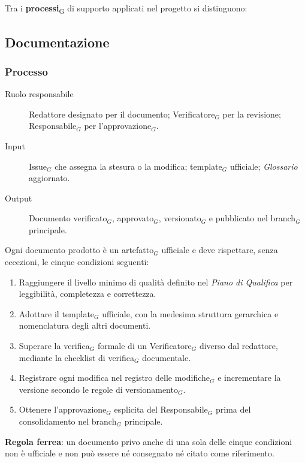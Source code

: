 \documentclass[a4paper, 10pt]{article}
\begin{document}
Tra i \textbf{processi}\textsubscript{G} di supporto applicati nel progetto si distinguono:

\subsection{Documentazione}
\label{subsec:documentazione}

\subsubsection{Processo}

\begin{description}
    \item[Ruolo responsabile] Redattore designato per il documento; Verificatore$_G$ per la revisione; Responsabile$_G$ per l'approvazione$_G$.
    \item[Input] Issue$_G$ che assegna la stesura o la modifica; template$_G$ ufficiale; \emph{Glossario} aggiornato.
    \item[Output] Documento verificato$_G$, approvato$_G$, versionato$_G$ e pubblicato nel branch$_G$ principale.
\end{description}

\noindent Ogni documento prodotto è un artefatto$_G$ ufficiale e deve rispettare, senza eccezioni, le cinque condizioni seguenti:
\begin{enumerate}
    \item Raggiungere il livello minimo di qualità definito nel \emph{Piano di Qualifica} per leggibilità, completezza e correttezza.
    \item Adottare il template$_G$ ufficiale, con la medesima struttura gerarchica e nomenclatura degli altri documenti.
    \item Superare la verifica$_G$ formale di un Verificatore$_G$ diverso dal redattore, mediante la checklist di verifica$_G$ documentale.
    \item Registrare ogni modifica nel registro delle modifiche$_G$ e incrementare la versione secondo le regole di versionamento$_G$.
    \item Ottenere l'approvazione$_G$ esplicita del Responsabile$_G$ prima del consolidamento nel branch$_G$ principale.
\end{enumerate}

\noindent \textbf{Regola ferrea}: un documento privo anche di una sola delle cinque condizioni non è ufficiale e non può essere né consegnato né citato come riferimento.
\end{document}
